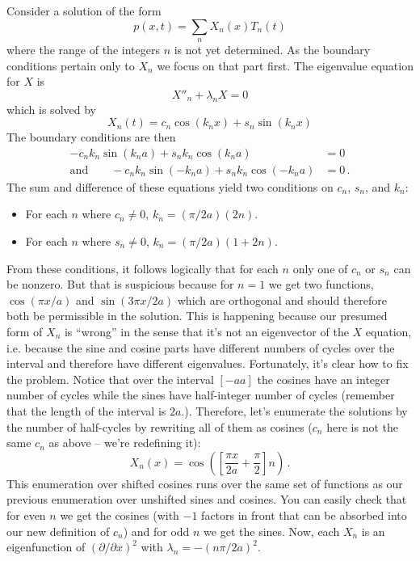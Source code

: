 Consider a solution of the form
\begin{equation*}
  p(x, t) = \sum_n X_n(x) T_n(t)
\end{equation*}
where the range of the integers $n$ is not yet determined.
As the boundary conditions pertain only to $X_n$ we focus on that part first.
The eigenvalue equation for $X$ is
\begin{equation*}
  X''_n + \lambda_n X = 0
\end{equation*}
which is solved by
\begin{equation*}
  X_n(t) = c_n \cos(k_n x) + s_n \sin(k_n x)
\end{equation*}
The boundary conditions are then
\begin{eqnarray*}
  - c_n k_n \sin(k_n a) + s_n k_n \cos(k_n a) &= 0 \\
  \text{and} \qquad
  - c_n k_n \sin(-k_n a) + s_n k_n \cos(-k_n a) &= 0
  \, .
\end{eqnarray*}
The sum and difference of these equations yield two conditions on $c_n$, $s_n$, and $k_n$:
\begin{itemize}
  \item For each $n$ where $c_n \neq 0$, $k_n = (\pi / 2 a) (2 n)$.
  \item For each $n$ where $s_n \neq 0$, $k_n = (\pi / 2 a) (1 + 2n)$.
\end{itemize}
From these conditions, it follows logically that for each $n$ only one of $c_n$ or $s_n$ can be nonzero.
But that is suspicious because for $n=1$ we get two functions, $\cos(\pi x / a)$ and $\sin(3 \pi x / 2 a)$ which are orthogonal and should therefore both be permissible in the solution.
This is happening because our presumed form of $X_n$ is ``wrong'' in the sense that it's not an eigenvector of the $X$ equation, i.e. because the sine and cosine parts have different numbers of cycles over the interval and therefore have different eigenvalues.
Fortunately, it's clear how to fix the problem.
Notice that over the interval $[-a a]$ the cosines have an integer number of cycles while the sines have half-integer number of cycles (remember that the length of the interval is $2 a$.).
Therefore, let's enumerate the solutions by the number of half-cycles by rewriting all of them as cosines ($c_n$ here is not the same $c_n$ as above -- we're redefining it):
\begin{equation*}
  X_n(x) = \cos \left( \left[ \frac{\pi x}{2 a} + \frac{\pi}{2} \right] n \right)
  \, .
\end{equation*}
This enumeration over shifted cosines runs over the same set of functions as our previous enumeration over unshifted sines and cosines.
You can easily check that for even $n$ we get the cosines (with $-1$ factors in front that can be absorbed into our new definition of $c_n$) and for odd $n$ we get the sines.
Now, each $X_n$ is an eigenfunction of $(\partial / \partial x)^2$ with $\lambda_n = - (n \pi / 2 a)^2$.

